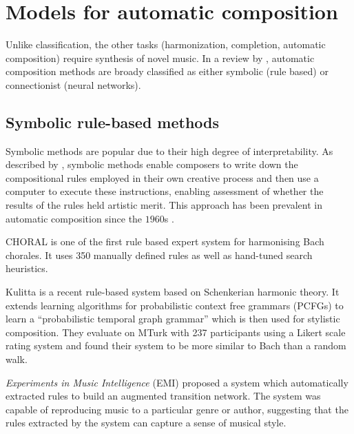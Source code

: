 \section{Models for automatic composition}

Unlike classification, the other tasks (harmonization, completion, automatic
composition) require synthesis of novel music. In a review by
\citet{toiviainen2000symbolic}, automatic composition methods are broady
classified as either symbolic (\ie rule based) or connectionist (\ie neural
networks).

\subsection{Symbolic rule-based methods}

Symbolic methods are popular due to their high degree of interpretability. As
described by \citet{todd1989connectionist}, symbolic methods enable composers
to write down the compositional rules employed in their own creative process
and then use a computer to execute these instructions, enabling assessment of
whether the results of the rules held artistic merit. This approach has been
prevalent in automatic composition since the $1960$s
\citep{todd1989connectionist}.

CHORAL \citep{ebciouglu1988expert} is one of the first rule based expert system
for harmonising Bach chorales. It uses 350 manually defined rules as well as
hand-tuned search heuristics.

Kulitta \citep{quick2014kulitta} is a recent rule-based system based on
Schenkerian harmonic theory\cite{schenker1954harmony}. It extends learning
algorithms for probabilistic context free grammars (PCFGs) to learn a
``probabilistic temporal graph grammar'' \citep{quick2013temporal} which is
then used for stylistic composition. They evaluate on MTurk with 237
participants using a Likert scale rating system \citep{likert1932technique}
and found their system to be more similar to Bach than a random walk.

\emph{Experiments in Music Intelligence} (EMI)
\citep{cope1987experiments,cope1992computer} proposed a system which
automatically extracted rules to build an augmented transition
network\citep{wanner1980atn}. The system was capable of reproducing music
to a particular genre or author, suggesting that the rules extracted by the
system can capture a sense of musical style.


